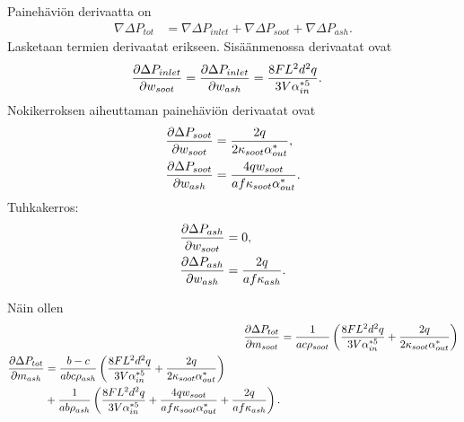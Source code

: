 Painehäviön derivaatta on
\begin{align}
    \nabla \Delta P_{tot} &=
    \nabla \Delta P_{inlet} + \nabla \Delta P_{soot} + \nabla \Delta P_{ash}.
\end{align}
Lasketaan termien derivaatat erikseen. Sisäänmenossa derivaatat ovat
\begin{align}
    \frac{\partial \Delta P_{inlet}}{\partial w_{soot}} &=
    \frac{\partial \Delta P_{inlet}}{\partial w_{ash}} =
    \frac{8 F L^2 d^2 q}{3 V \alpha_{in}^{*5}} .
\end{align}
Nokikerroksen aiheuttaman painehäviön derivaatat ovat
\begin{align}
    \frac{\partial \Delta P_{soot}}{\partial w_{soot}} &=
    \frac{2 q}{2 \kappa_{soot} \alpha_{out}^*},
    \\\frac{\partial \Delta P_{soot}}{\partial w_{ash}}
    &=
    \frac{4qw_{soot}}{a f\kappa_{soot} \alpha_{out}^* }.
\end{align}
Tuhkakerros:
\begin{align}
    \frac{\partial \Delta P_{ash}}{\partial w_{soot}} &= 0,
    \\\frac{\partial \Delta P_{ash}}{\partial w_{ash}} &=
    \frac{2q}{a f \kappa_{ash}  }.
\end{align}

Näin ollen 
\begin{align}
    \frac{\partial \Delta P_{tot}}{\partial m_{soot}} &=
     \frac{1}{ac\rho_{soot}}
    \left(\frac{8 F L^2 d^2 q}{3 V \alpha_{in}^{*5}} +
     \frac{2 q}{2 \kappa_{soot} \alpha_{out}^*}
    \right)\\
\begin{split}
    \frac{\partial \Delta P_{tot}}{\partial m_{ash}} &=
    \frac{b-c}{abc\rho_{ash}}\left(\frac{8 F L^2 d^2 q}{3 V \alpha_{in}^{*5}} +
     \frac{2 q}{2 \kappa_{soot} \alpha_{out}^*}
    \right) \\
    & + 
    \frac{1}{ab\rho_{ash}} \left(
        \frac{8 F L^2 d^2 q}{3 V \alpha_{in}^{*5}} +
        \frac{4qw_{soot}}{a f \kappa_{soot} \alpha_{out}^*  } +
        \frac{2q}{a f \kappa_{ash}  }
    \right).
\end{split}
\end{align}




